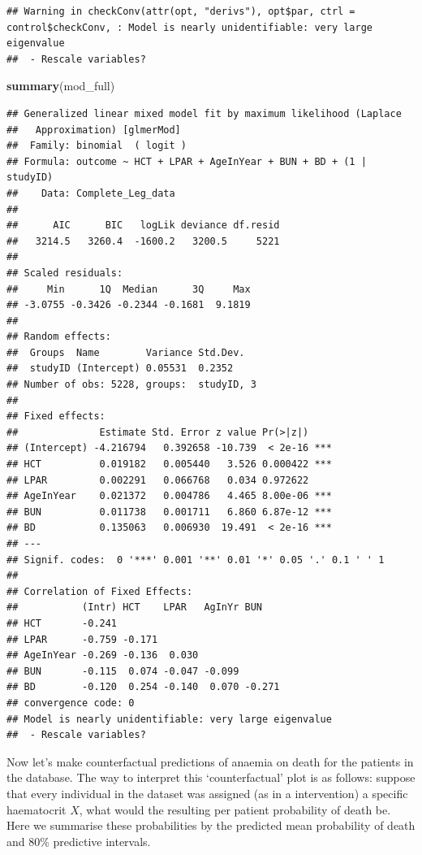 \documentclass[]{article}
\newenvironment{Shaded}{\begin{snugshade}}{\end{snugshade}}
\newcommand{\KeywordTok}[1]{\textcolor[rgb]{0.13,0.29,0.53}{\textbf{#1}}}
\newcommand{\NormalTok}[1]{#1}
\begin{document}
\begin{verbatim}
## Warning in checkConv(attr(opt, "derivs"), opt$par, ctrl = control$checkConv, : Model is nearly unidentifiable: very large eigenvalue
##  - Rescale variables?
\end{verbatim}

\begin{Shaded}
\begin{Highlighting}[]
\KeywordTok{summary}\NormalTok{(mod_full)}
\end{Highlighting}
\end{Shaded}

\begin{verbatim}
## Generalized linear mixed model fit by maximum likelihood (Laplace
##   Approximation) [glmerMod]
##  Family: binomial  ( logit )
## Formula: outcome ~ HCT + LPAR + AgeInYear + BUN + BD + (1 | studyID)
##    Data: Complete_Leg_data
## 
##      AIC      BIC   logLik deviance df.resid 
##   3214.5   3260.4  -1600.2   3200.5     5221 
## 
## Scaled residuals: 
##     Min      1Q  Median      3Q     Max 
## -3.0755 -0.3426 -0.2344 -0.1681  9.1819 
## 
## Random effects:
##  Groups  Name        Variance Std.Dev.
##  studyID (Intercept) 0.05531  0.2352  
## Number of obs: 5228, groups:  studyID, 3
## 
## Fixed effects:
##              Estimate Std. Error z value Pr(>|z|)    
## (Intercept) -4.216794   0.392658 -10.739  < 2e-16 ***
## HCT          0.019182   0.005440   3.526 0.000422 ***
## LPAR         0.002291   0.066768   0.034 0.972622    
## AgeInYear    0.021372   0.004786   4.465 8.00e-06 ***
## BUN          0.011738   0.001711   6.860 6.87e-12 ***
## BD           0.135063   0.006930  19.491  < 2e-16 ***
## ---
## Signif. codes:  0 '***' 0.001 '**' 0.01 '*' 0.05 '.' 0.1 ' ' 1
## 
## Correlation of Fixed Effects:
##           (Intr) HCT    LPAR   AgInYr BUN   
## HCT       -0.241                            
## LPAR      -0.759 -0.171                     
## AgeInYear -0.269 -0.136  0.030              
## BUN       -0.115  0.074 -0.047 -0.099       
## BD        -0.120  0.254 -0.140  0.070 -0.271
## convergence code: 0
## Model is nearly unidentifiable: very large eigenvalue
##  - Rescale variables?
\end{verbatim}

Now let's make counterfactual predictions of anaemia on death for the
patients in the database. The way to interpret this `counterfactual'
plot is as follows: suppose that every individual in the dataset was
assigned (as in a intervention) a specific haematocrit \(X\), what would
the resulting per patient probability of death be. Here we summarise
these probabilities by the predicted mean probability of death and 80\%
predictive intervals.
\end{document}
